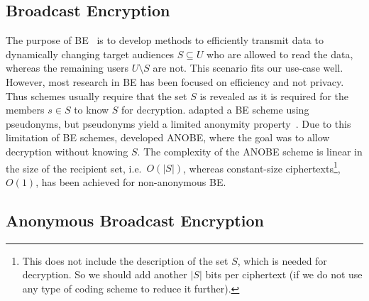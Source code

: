 \subsection<article>{Broadcast Encryption}\label{sec:BE}

The purpose of \ac{BE}~\cite{broadcastenc} is to develop methods to 
efficiently transmit data to dynamically changing target audiences 
\(S\subseteq U\) who are allowed to read the data, whereas the remaining users 
\(U\setminus S\) are not.
This scenario fits our use-case well.
However, most research in \ac{BE} has been focused on efficiency and not 
privacy.
Thus schemes usually require that the set \(S\) is revealed as it is required 
for the members \(s\in S\) to know \(S\) for decryption.
\citet{PseudonymousBE} adapted a \ac{BE} scheme using pseudonyms, but 
pseudonyms yield a limited anonymity property~\cite{PseudonymousBE}.
Due to this limitation of \ac{BE} schemes, \citet{ANOBE} developed \ac{ANOBE}, 
where the goal was to allow decryption without knowing \(S\).
The complexity of the \ac{ANOBE} scheme is linear in the size of the recipient 
set, i.e.~\(O(|S|)\), whereas constant-size ciphertexts\footnote{%
  This does not include the description of the set \(S\), which is needed for 
  decryption.
  So we should add another \(|S|\) bits per ciphertext (if we do not use any 
  type of coding scheme to reduce it further).
}, \(O(1)\), has been achieved for non-anonymous \ac{BE}.

\subsection{Anonymous Broadcast Encryption}\label{sec:ANOBE}


